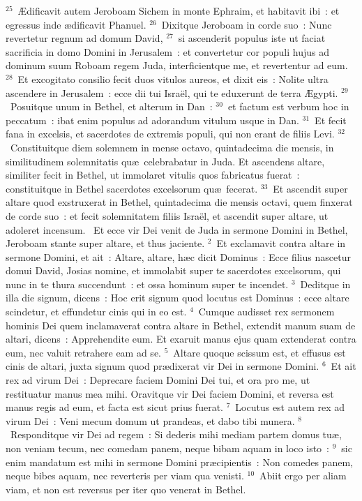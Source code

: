 ${}^{25}$~\AE dificavit autem Jeroboam Sichem in monte Ephraim, et habitavit ibi~: et egressus inde \ae dificavit Phanuel.
${}^{26}$~Dixitque Jeroboam in corde suo~: Nunc revertetur regnum ad domum David,
${}^{27}$~si ascenderit populus iste ut faciat sacrificia in domo Domini in Jerusalem~: et convertetur cor populi hujus ad dominum suum Roboam regem Juda, interficientque me, et revertentur ad eum.
${}^{28}$~Et excogitato consilio fecit duos vitulos aureos, et dixit eis~: Nolite ultra ascendere in Jerusalem~: ecce dii tui Isra\"el, qui te eduxerunt de terra \AE gypti.
${}^{29}$~Posuitque unum in Bethel, et alterum in Dan~:
${}^{30}$~et factum est verbum hoc in peccatum~: ibat enim populus ad adorandum vitulum usque in Dan.
${}^{31}$~Et fecit fana in excelsis, et sacerdotes de extremis populi, qui non erant de filiis Levi.
${}^{32}$~Constituitque diem solemnem in mense octavo, quintadecima die mensis, in similitudinem solemnitatis qu\ae\ celebrabatur in Juda. Et ascendens altare, similiter fecit in Bethel, ut immolaret vitulis quos fabricatus fuerat~: constituitque in Bethel sacerdotes excelsorum qu\ae\ fecerat.
${}^{33}$~Et ascendit super altare quod exstruxerat in Bethel, quintadecima die mensis octavi, quem finxerat de corde suo~: et fecit solemnitatem filiis Isra\"el, et ascendit super altare, ut adoleret incensum.
~Et ecce vir Dei venit de Juda in sermone Domini in Bethel, Jeroboam stante super altare, et thus jaciente.
${}^{2}$~Et exclamavit contra altare in sermone Domini, et ait~: Altare, altare, h\ae c dicit Dominus~: Ecce filius nascetur domui David, Josias nomine, et immolabit super te sacerdotes excelsorum, qui nunc in te thura succendunt~: et ossa hominum super te incendet.
${}^{3}$~Deditque in illa die signum, dicens~: Hoc erit signum quod locutus est Dominus~: ecce altare scindetur, et effundetur cinis qui in eo est.
${}^{4}$~Cumque audisset rex sermonem hominis Dei quem inclamaverat contra altare in Bethel, extendit manum suam de altari, dicens~: Apprehendite eum. Et exaruit manus ejus quam extenderat contra eum, nec valuit retrahere eam ad se.
${}^{5}$~Altare quoque scissum est, et effusus est cinis de altari, juxta signum quod pr\ae dixerat vir Dei in sermone Domini.
${}^{6}$~Et ait rex ad virum Dei~: Deprecare faciem Domini Dei tui, et ora pro me, ut restituatur manus mea mihi. Oravitque vir Dei faciem Domini, et reversa est manus regis ad eum, et facta est sicut prius fuerat.
${}^{7}$~Locutus est autem rex ad virum Dei~: Veni mecum domum ut prandeas, et dabo tibi munera.
${}^{8}$~Responditque vir Dei ad regem~: Si dederis mihi mediam partem domus tu\ae , non veniam tecum, nec comedam panem, neque bibam aquam in loco isto~:
${}^{9}$~sic enim mandatum est mihi in sermone Domini pr\ae cipientis~: Non comedes panem, neque bibes aquam, nec reverteris per viam qua venisti.
${}^{10}$~Abiit ergo per aliam viam, et non est reversus per iter quo venerat in Bethel.


